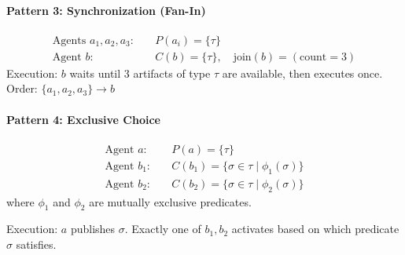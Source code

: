 \documentclass[11pt]{article}
\begin{document}
\paragraph{Pattern 3: Synchronization (Fan-In)}
\begin{align*}
\text{Agents } a_1, a_2, a_3: &\quad P(a_i) = \{\tau\} \\
\text{Agent } b: &\quad C(b) = \{\tau\}, \quad \text{join}(b) = (\text{count} = 3)
\end{align*}
Execution: $b$ waits until 3 artifacts of type $\tau$ are available, then executes once. Order: $\{a_1, a_2, a_3\} \rightarrow b$ \checkmark

\paragraph{Pattern 4: Exclusive Choice}
\begin{align*}
\text{Agent } a: &\quad P(a) = \{\tau\} \\
\text{Agent } b_1: &\quad C(b_1) = \{\sigma \in \tau \mid \phi_1(\sigma)\} \\
\text{Agent } b_2: &\quad C(b_2) = \{\sigma \in \tau \mid \phi_2(\sigma)\}
\end{align*}
where $\phi_1$ and $\phi_2$ are mutually exclusive predicates.

Execution: $a$ publishes $\sigma$. Exactly one of $b_1, b_2$ activates based on which predicate $\sigma$ satisfies. \checkmark
\end{document}
